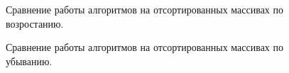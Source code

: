 \documentclass[12pt,a4paper]{report}
\begin{document}
\begin{figure}[ht!]
	\caption{Сравнение работы алгоритмов на отсортированных массивах по возростанию.}
	\label{fig:image}
\end{figure}


\begin{figure}[ht!]
	\caption{Сравнение работы алгоритмов на отсортированных массивах по убыванию.}
	\label{fig:image}
\end{figure}
\end{document}
